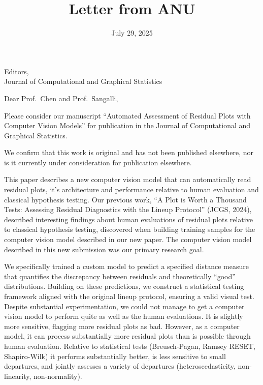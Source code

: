 \documentclass[
  12pt,
  letterpaper]{letter}
\title{Letter from ANU}
\author{\hspace{0pt}}
\date{July 29, 2025}
\begin{document}


\signature{
\hspace{0pt}}
\address{Australian National University\\Research School of Finance,
Actuarial Studies and Statistics\\26C Kingsley
Street\\Canberra 2600\\Australia\\[2mm]}
\begin{letter}{Editors,\\Journal of Computational and Graphical
Statistics}
\opening{Dear Prof.~Chen and Prof.~Sangalli,}


Please consider our manuscript ``Automated Assessment of Residual Plots
with Computer Vision Models'' for publication in the Journal of
Computational and Graphical Statistics.

We confirm that this work is original and has not been published
elsewhere, nor is it currently under consideration for publication
elsewhere.

This paper describes a new computer vision model that can automatically
read residual plots, it's architecture and performance relative to human
evaluation and classical hypothesis testing. Our previous work, ``A Plot
is Worth a Thousand Tests: Assessing Residual Diagnostics with the
Lineup Protocol'' (JCGS, 2024), described interesting findings about
human evaluations of residual plots relative to classical hypothesis
testing, discovered when building training samples for the computer
vision model described in our new paper. The computer vision model
described in this new submission was our primary research goal.

We specifically trained a custom model to predict a specified distance
measure that quantifies the discrepancy between residuals and
theoretically ``good'' distributions. Building on these predictions, we
construct a statistical testing framework aligned with the original
lineup protocol, ensuring a valid visual test. Despite substantial
experimentation, we could not manage to get a computer vision model to
perform quite as well as the human evaluations. It is slightly more
sensitive, flagging more residual plots as bad. However, as a computer
model, it can process substantially more residual plots than is possible
through human evaluation. Relative to statistical tests (Breusch-Pagan,
Ramsey RESET, Shapiro-Wilk) it performs substantially better, is less
sensitive to small departures, and jointly assesses a variety of
departures (heteroscedasticity, non-linearity, non-normality).


\end{letter}
\end{document}
